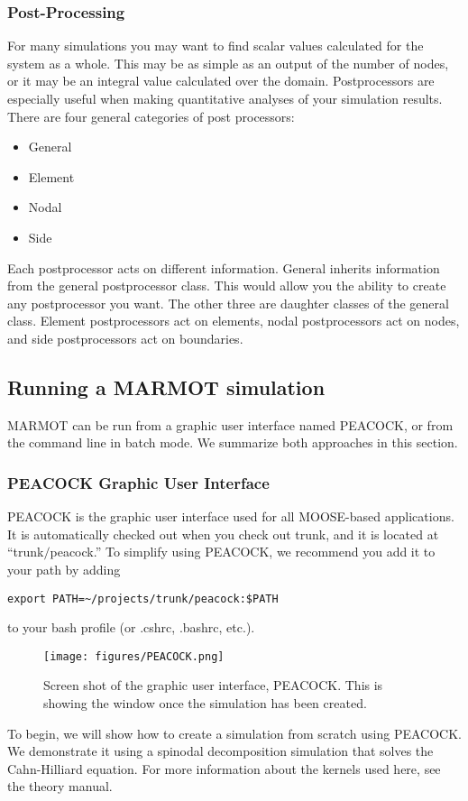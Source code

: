 \documentclass[letter,12pt,fleqn]{article}
\begin{document}
\subsubsection{Post-Processing}

For many simulations you may want to find scalar values calculated for the system as a whole. This may be as simple as an output of the number of nodes, or it may be an integral value calculated over the domain. Postprocessors are especially useful when making quantitative analyses of your simulation results. There are four general categories of post processors:
\begin{itemize}
\item General
\item Element
\item Nodal
\item Side
\end{itemize}
Each postprocessor acts on different information. General inherits information from the general postprocessor class. This would allow you the ability to create any postprocessor you want. The other three are daughter classes of the general class. Element postprocessors act on elements, nodal postprocessors act on nodes, and side postprocessors act on boundaries. 

\subsection{Running a MARMOT simulation}
MARMOT can be run from a graphic user interface named PEACOCK, or from the command line in batch mode. We summarize both approaches in this section.
\subsubsection{PEACOCK Graphic User Interface}
PEACOCK is the graphic user interface used for all MOOSE-based applications. It is automatically checked out when you check out trunk, and it is located at ``trunk$/$peacock.'' To simplify using PEACOCK, we recommend you add it to your path by adding
\begin{verbatim}
export PATH=~/projects/trunk/peacock:$PATH
\end{verbatim}
to your bash profile (or .cshrc, .bashrc, etc.).

\begin{figure}[t!]
  \centering
  \texttt{[image: figures/PEACOCK.png]}
  \caption{Screen shot of the graphic user interface, PEACOCK. This is showing the window once the simulation has been created.} \label{fig:peacock}
\end{figure}
To begin, we will show how to create a simulation from scratch using PEACOCK. We demonstrate it using a spinodal decomposition simulation that solves the Cahn-Hilliard equation. For more information about the kernels used here, see the theory manual. 
\end{document}
